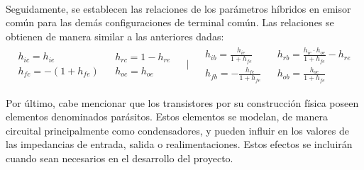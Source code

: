 \paragraph{}
Seguidamente, se establecen las relaciones de los parámetros híbridos en emisor com\'un para las demás configuraciones de terminal común. Las relaciones se obtienen de manera similar a las anteriores dadas:
   \begin{equation} \label{eq:h_conversion}
\begin{array}{rrcll} 
      \begin{array}{l}
	 h_{ic} = h_{ie} \\
	 h_{fc} = - (1+ h_{fe} )
      \end{array}
      &
      \begin{array}{l}
	 h_{rc} = 1 - h_{re} \\
	 h_{oc} = h_{oe}
      \end{array}
      &
      \begin{array}{l}
	 \bigg|
      \end{array}
      &
      \begin{array}{l}
	 h_{ib} = \frac{h_{ie}}{1+h_{fe}} \\
	 h_{fb} = -\frac{h_{fe}}{1+h_{fe}} 
      \end{array}
      &
      \begin{array}{l}
	 h_{rb} = \frac{h_{ie} \cdot h_{oe}}{1+h_{fe}} - h_{re}\\
	 h_{ob} = \frac{h_{oe}}{1+h_{fe}} 
      \end{array}
\end{array}
   \end{equation}

Por último, cabe mencionar que los transistores por su construcción física poseen elementos denominados parásitos. Estos elementos se modelan, de manera circuital principalmente como condensadores, y pueden influir en los valores de las impedancias de entrada, salida o realimentaciones. Estos efectos se incluirán cuando sean necesarios en el desarrollo del proyecto.
